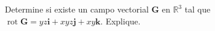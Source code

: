 \item Determine si existe un campo vectorial $\mathbf{G}$ en $\mathbb{R}^3$ tal que $\operatorname{rot} \mathbf{G} = yz\mathbf{i} + xyz\mathbf{j} + xy\mathbf{k}$. Explique.
